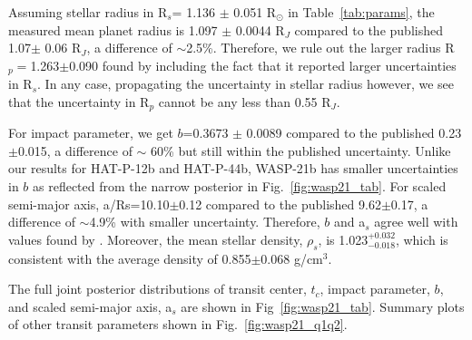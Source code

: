 Assuming stellar radius in R$_s$= 1.136 $\pm$ 0.051 R$_{\odot}$ in Table~\ref{tab:params}, the measured mean planet radius is 1.097 $\pm$ 0.0044 R$_J$ compared to the published 1.07$\pm$ 0.06 R$_J$,
a difference of $\sim$2.5\%. %
Therefore, we rule out the larger radius R$_p=$1.263$\pm$0.090 found by \cite{Southworth2012} including the fact that it reported larger uncertainties in R$_s$.
In any case, propagating the uncertainty in stellar radius however, we see that the uncertainty in R$_p$ cannot be any less than 0.55 R$_J$.

For impact parameter, we get $b$=0.3673 $\pm$ 0.0089 compared to the published 0.23$\pm$0.015, a difference of $\sim$ 60\% but still within the published uncertainty. Unlike our results for HAT-P-12b and HAT-P-44b, WASP-21b has smaller uncertainties in $b$ as reflected from the narrow posterior in Fig.~\ref{fig:wasp21_tab}. For scaled semi-major axis, a/Rs=10.10$\pm$0.12 compared to the published 9.62$\pm$0.17, a difference of $\sim$4.9\% with smaller uncertainty. Therefore, $b$ and a$_s$ agree well with values found by \cite{Bouchy2010}. Moreover, the mean stellar density, $\rho_s$, is 1.023$_{-0.018}^{+0.032}$, which is consistent with the average density of 0.855$\pm$0.068 g/cm$^3$.

The full joint posterior distributions of transit center, $t_c$, impact parameter, $b$, and scaled semi-major axis, a$_s$ are shown in Fig~\ref{fig:wasp21_tab}. Summary plots of other transit parameters shown in Fig.~\ref{fig:wasp21_q1q2}.

